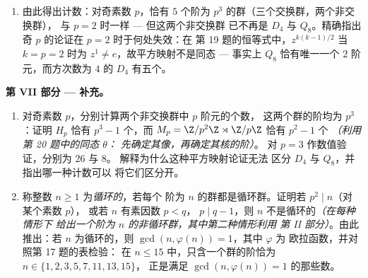 \begin{problem}
\begin{enumerate}[resume]
{        使 $s = tr^{a}$ 满足 $s^p = e$；$p$ 为奇数在何处用到
        ？）}。证明 $srs^{-1} = r^{1+p}$ 在将 $s$ 换为
        某个幂之后成立，并由此得出：恰有\emph{一个}
        阶为 $p^3$ 且方次数为 $p^2$ 的非交换群，
        即 $\Z/p^2\Z \rtimes_\varphi \Z/p\Z$，其中
        $\varphi(1)\colon r \mapsto r^{1+p}$\emph{（利用
        第 3 题；$\operatorname{Aut}(\Z/p^2\Z)$ 为循环群，阶为
        $p(p-1)$，在本阶段不加证明地承认，因而它有唯一的
        $p$ 阶子群）}。
  \item 由此得出计数：对奇素数 $p$，恰有 $5$
        个阶为 $p^3$ 的群（三个交换群，两个非交换群），
        与 $p = 2$ 时一样 --- 但这两个非交换群
        已不再是 $D_4$ 与 $Q_8$。精确指出
        奇 $p$ 的论证在 $p = 2$ 时于何处失效：在
        第 19 题的恒等式中，$z^{k(k-1)/2}$ 当 $k = p = 2$ 时为 $z^1 \neq
        e$，故平方映射不是同态 --- 事实上 $Q_8$
        恰有唯一一个 $2$ 阶元，而方次数为 $4$ 的
        $D_4$ 有五个。
\end{enumerate}

\medskip
\noindent\textbf{第 VII 部分 --- 补充。}
\begin{enumerate}[resume]
  \item 对奇素数 $p$，分别计算两个非交换群中 $p$ 阶元的个数，
        这两个群的阶均为 $p^3$：证明
        $H_p$ 恰有 $p^3 - 1$ 个，而 $M_p =
        \Z/p^2\Z \rtimes \Z/p\Z$ 恰有 $p^2 - 1$ 个
        \emph{（利用第 20 题中的同态 $\theta$：
        先确定其像，再确定其核的阶）}。
        对 $p = 3$ 作数值验证，分别为 $26$ 与 $8$。
        解释为什么这种平方映射论证无法
        区分 $D_4$ 与 $Q_8$，并指出哪一种计数可以
        将它们区分开。
  \item 称整数 $n \geq 1$ 为\emph{循环的}，若每个
        阶为 $n$ 的群都是循环群。证明若 $p^2 \mid n$（对某个素数 $p$），
        或若 $n$ 有素因数 $p < q$，
        $p \mid q - 1$，则 $n$ 不是循环的\emph{（在每种情形下
        给出一个阶为 $n$ 的非循环群，其中第二种情形利用
        第 II 部分）}。由此推出：若 $n$ 为循环的，则
        $\gcd(n, \varphi(n)) = 1$，其中 $\varphi$ 为
        欧拉函数，并对照第 17 题的表检验：
        在 $n \leq 15$ 中，只含一个群的阶恰为
        $n \in \{1, 2, 3, 5, 7, 11, 13, 15\}$，
        正是满足 $\gcd(n, \varphi(n)) = 1$ 的那些数。
\end{enumerate}
\end{problem}
